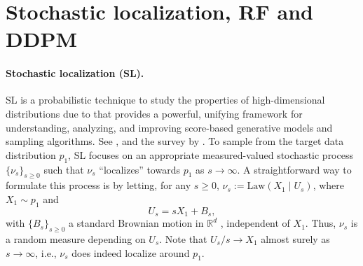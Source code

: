 \documentclass{article}
\theoremstyle{plain}
\theoremstyle{definition}
\theoremstyle{remark}
\def\bbR{\mathbb{R}}
\newcommand{\Law}{\text{Law}}
\begin{document}
\section{Stochastic localization, RF and DDPM}
\label{sec: SL}
\paragraph{Stochastic localization (SL).} 
SL  is a probabilistic technique to study the properties of high-dimensional distributions due to \citet{eldan2013thin,eldan2020taming} that provides a powerful, unifying framework for understanding, analyzing, and improving score-based generative models and sampling algorithms. See  \citet{el2022information}, \citet{montanari2023sampling} and the survey by \citet{shi2025perspectivesstochasticlocalization}. To sample from the target data distribution $p_1$, SL focuses on an appropriate measured-valued stochastic process $\{\nu_s\}_{s\ge 0}$ such that $\nu_s$ ``localizes'' towards $p_1$ as $s \to \infty$. A straightforward way to formulate this  process is by letting, for any $s \geq 0$, $\nu_s := \Law (X_1 \mid U_s)$, where $X_1 \sim p_1$ and 
\begin{equation}
\label{eq: SL process}
    U_s = s X_1 + B_s,
\end{equation}
with $\{B_s\}_{s \ge 0}$  a standard Brownian motion in $\bbR^d$ \citep{montanari2023sampling}, independent of $X_1$. Thus, $\nu_s$ is a random measure depending on $U_s$. Note that $U_s/s \to X_1$ almost surely as $s \to \infty$, i.e., $\nu_s$ does indeed localize around $p_1$. 
\end{document}
